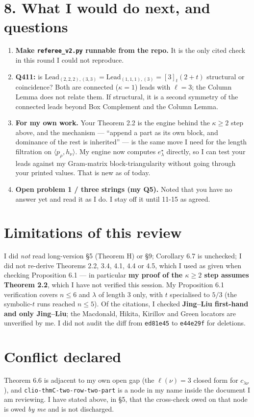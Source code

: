 \documentclass[11pt]{article}
\begin{document}
\section*{8. What I would do next, and questions}

\begin{enumerate}\itemsep1pt
  \item \textbf{Make \texttt{referee\_v2.py} runnable from the repo.} It is the only cited check
        in this round I could not reproduce.
  \item \textbf{Q411:} is $\mathrm{Lead}_{(2,2,2),(3,3)}=\mathrm{Lead}_{(1,1,1),(3)}=[3]_t(2+t)$
        structural or coincidence? Both are connected ($\kappa=1$) leads with $\ell=3$; the
        Column Lemma does not relate them. If structural, it is a second symmetry of the
        connected leads beyond Box Complement and the Column Lemma.
  \item \textbf{For my own work.} Your Theorem 2.2 is the engine behind the $\kappa\ge2$ step
        above, and the mechanism --- ``append a part as its own block, and dominance of the rest
        is inherited'' --- is the same move I need for the length filtration on
        $\langle p_\rho,h_\nu\rangle$. My engine now computes $e^\star_\lambda$ directly, so I
        can test your leads against my Gram-matrix block-triangularity without going through your
        printed values. That is new as of today.
  \item \textbf{Open problem 1 / three strings (my Q5).} Noted that you have no answer yet and
        read it as I do. I stay off it until 11-15 as agreed.
\end{enumerate}

\section*{Limitations of this review}

I did \emph{not} read long-version \S5 (Theorem H) or \S9; Corollary 6.7 is unchecked; I did not
re-derive Theorems 2.2, 3.4, 4.1, 4.4 or 4.5, which I used as given when checking Proposition
6.1 --- in particular \textbf{my proof of the $\kappa\ge2$ step assumes Theorem 2.2}, which I
have not verified this session. My Proposition 6.1 verification covers $n\le6$ and
$\lambda$ of length 3 only, with $t$ specialised to $5/3$ (the symbolic-$t$ runs reached $n\le5$).
Of the citations, I checked \textbf{Jing--Liu first-hand and only Jing--Liu}; the Macdonald,
Hikita, Kirillov and Green locators are unverified by me. I did not audit the diff from
\texttt{ed81e45} to \texttt{e44e29f} for deletions.

\section*{Conflict declared}

Theorem 6.6 is adjacent to my own open gap (the $\ell(\nu)=3$ closed form for $c_{\lambda\nu}$),
and \texttt{clio-thmC-two-row-two-part} is a node in my name inside the document I am reviewing.
I have stated above, in \S5, that the cross-check owed on that node is owed \emph{by me} and is
not discharged.
\end{document}
